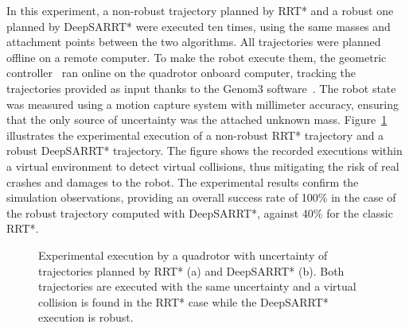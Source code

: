 In this experiment, a non-robust trajectory planned by RRT* and a robust one planned by DeepSARRT* were executed ten times, using the same masses and attachment points between the two algorithms.
All trajectories were planned offline on a remote computer. 
To make the robot execute them, the geometric controller~\cite{cLee} ran online on the quadrotor onboard computer, tracking the trajectories provided as input thanks to the Genom3 software~\cite{cGenom3}. 
The robot state was measured using a motion capture system with millimeter accuracy, ensuring that the only source of uncertainty was the attached unknown mass.
Figure~\ref{fig: exp window} illustrates the experimental execution of a non-robust RRT* trajectory and a robust DeepSARRT* trajectory. 
The figure shows the recorded executions within a virtual environment to detect virtual collisions, thus mitigating the risk of real crashes and damages to the robot.
The experimental results confirm the simulation observations, providing an overall success rate of 100\% in the case of the robust trajectory computed with DeepSARRT*, against 40\% for the classic RRT*.

\begin{figure} [htp]
    \centering
    \caption{Experimental execution by a quadrotor with uncertainty of trajectories planned by RRT* (a) and DeepSARRT* (b). 
    Both trajectories are executed with the same uncertainty and a virtual collision is found in the RRT* case while the DeepSARRT* execution is robust.}%
    \label{fig: exp window}%
\end{figure}

